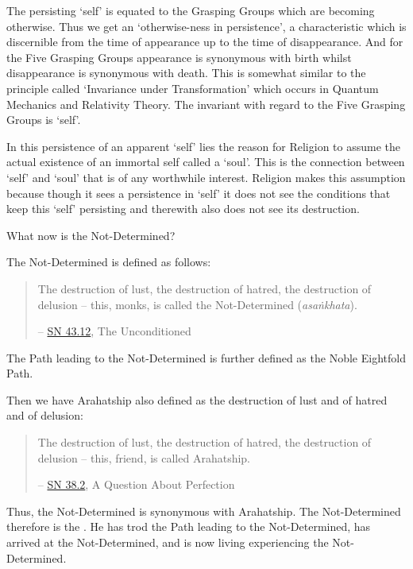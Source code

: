 The persisting `self' is equated to the Grasping Groups which are becoming otherwise. Thus we get an `otherwise-ness in persistence', a characteristic which is discernible from the time of appearance up to the time of disappearance. And for the Five Grasping Groups appearance is synonymous with birth whilst disappearance is synonymous with death. This is somewhat similar to the principle called `Invariance under Transformation' which occurs in Quantum Mechanics and Relativity Theory. The invariant with regard to the Five Grasping Groups is `self'.

In this persistence of an apparent `self' lies the reason for Religion to assume the actual existence of an immortal self called a `soul'. This is the connection between `self' and `soul' that is of any worthwhile interest. Religion makes this assumption because though it sees a persistence in `self' it does not see the conditions that keep this `self' persisting and therewith also does not see its destruction.

What now is the Not-Determined?

The Not-Determined is defined as follows:

\begin{quote}
The destruction of lust, the destruction of hatred, the destruction of delusion -- this, monks, is called the Not-Determined (\emph{asaṅkhata}).

 -- \href{https://suttacentral.net/sn43.12/en/bodhi}{SN 43.12}, The Unconditioned
\end{quote}

The Path leading to the Not-Determined is further defined as the Noble Eightfold Path.

Then we have Arahatship also defined as the destruction of lust and of hatred and of delusion:

\begin{quote}
The destruction of lust, the destruction of hatred, the destruction of delusion -- this, friend, is called Arahatship.

 -- \href{https://suttacentral.net/sn38.2/en/sujato}{SN 38.2}, A Question About Perfection
\end{quote}

\protect\hypertarget{living-experience}{}{}Thus, the Not-Determined is synonymous with Arahatship. The Not-Determined therefore is the . He has trod the Path leading to the Not-Determined, has arrived at the Not-Determined, and is now living experiencing the Not-Determined.

